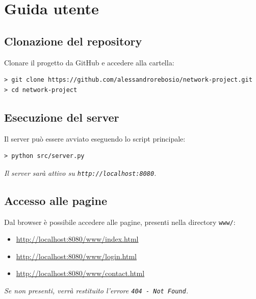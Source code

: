 \documentclass[a4paper,12pt]{report}
\begin{document}
\appendix
\chapter{Guida utente}
\section{Clonazione del repository}
Clonare il progetto da GitHub e accedere alla cartella:

{\footnotesize
\begin{verbatim}
> git clone https://github.com/alessandrorebosio/network-project.git
> cd network-project
\end{verbatim}
}

\section{Esecuzione del server}
Il server può essere avviato eseguendo lo script principale:

{\footnotesize
\begin{verbatim}
> python src/server.py
\end{verbatim}
}
\noindent \textit{Il server sarà attivo su \texttt{http://localhost:8080}.}

\section{Accesso alle pagine}
Dal browser è possibile accedere alle pagine, presenti nella directory \texttt{www/}:

{\footnotesize
\begin{itemize}
	\item \url{http://localhost:8080/www/index.html}
	\item \url{http://localhost:8080/www/login.html}
	\item \url{http://localhost:8080/www/contact.html}
\end{itemize}
}

\noindent \textit{Se non presenti, verrà restituito l'errore \texttt{404 - Not Found}.}
\end{document}
